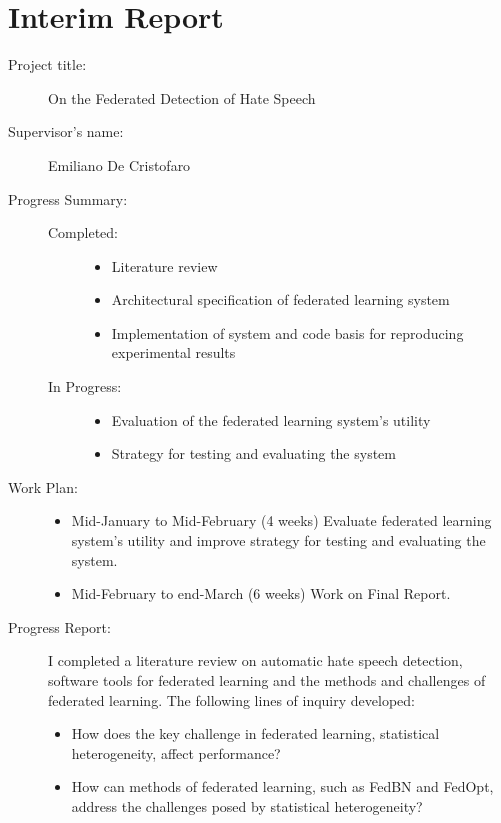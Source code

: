 \documentclass[12pt,leqno]{report}
\begin{document}
\chapter{Interim Report}
\begin{description}
\item[Project title:] On the Federated Detection of Hate Speech

\item[Supervisor’s name:] Emiliano De Cristofaro

\item[Progress Summary:] \hfill
\begin{description}

\item[Completed:] \hfill
\begin{itemize}
\item Literature review
\item Architectural specification of federated learning system
\item Implementation of system and code basis for reproducing experimental results 
\end{itemize}
\item[In Progress:] \hfill
\begin{itemize}
\item Evaluation of the federated learning system’s utility
\item Strategy for testing and evaluating the system
\end{itemize}
\end{description}

\item[Work Plan:] \hfill
\begin{itemize}
\item Mid-January to Mid-February (4 weeks) Evaluate federated learning system’s utility and improve strategy for testing and evaluating the system.

\item Mid-February to end-March (6 weeks) Work on Final Report.
\end{itemize}
\item[Progress Report:] \hfill

I completed a literature review on automatic hate speech detection, software tools for federated learning and the methods and challenges of federated learning.
The following lines of inquiry developed:
\begin{itemize}
\item How does the key challenge in federated learning, statistical heterogeneity, affect performance?
\item How can methods of federated learning, such as FedBN and FedOpt, address the challenges posed by statistical heterogeneity?
\end{itemize}


\end{description}
\end{document}
